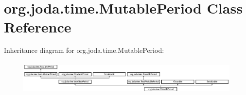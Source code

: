 \hypertarget{classorg_1_1joda_1_1time_1_1_mutable_period}{\section{org.\-joda.\-time.\-Mutable\-Period Class Reference}
\label{classorg_1_1joda_1_1time_1_1_mutable_period}
}
Inheritance diagram for org.\-joda.\-time.\-Mutable\-Period\-:\begin{figure}[H]
\begin{center}
\leavevmode
\includegraphics[height=1.761006cm]{classorg_1_1joda_1_1time_1_1_mutable_period}
\end{center}
\end{figure}
